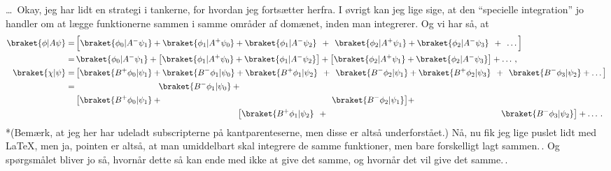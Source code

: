 \documentclass{report}
\begin{document}
\ldots\ Okay, jeg har lidt en strategi i tankerne, for hvordan jeg fortsætter herfra. I øvrigt kan jeg lige sige, at den ``specielle integration'' jo handler om at lægge funktionerne sammen i samme områder af domænet, inden man integrerer. Og vi har så, at
\begin{align}
\begin{aligned}
	\braket{\phi| A \psi} = &\,
			\Big[
			\braket{\phi_0 | A^- \psi_1} 
				+ \braket{\phi_1 | A^+ \psi_0} 
				+ \braket{\phi_1 | A^- \psi_2} 
				\:\:+\:\: \braket{\phi_2 | A^+ \psi_1} 
				+ \braket{\phi_2 | A^- \psi_3} 
				\:\:+\:\: \ldots
			\Big]%
			\\
		=&\,
			\braket{\phi_0 | A^- \psi_1} +
			\big[
				\braket{\phi_1 | A^+ \psi_0} +
				\braket{\phi_1 | A^- \psi_2}
			\big] + \big[
				\braket{\phi_2 | A^+ \psi_1} +
				\braket{\phi_2 | A^- \psi_3} 
			\big]%
			+ \ldots\,,\\
	\braket{\chi| \psi} = &\,
			\big[
				\braket{B^+ \phi_0 | \psi_1} +
					\braket{B^- \phi_1 | \psi_0} +
					\braket{B^+ \phi_1 | \psi_2} \:\:+\:\:
					\braket{B^- \phi_2 | \psi_1} +
					\braket{B^+ \phi_2 | \psi_3} \:\:+\:\:
					\braket{B^- \phi_3 | \psi_2} +
					\ldots
			\big]%
			\\
		= &\,
\phantom{	\big[
				\braket{B^+ \phi_0 | \psi_1} +			}
				\braket{B^- \phi_1 | \psi_0} +
\phantom{		\braket{B^+ \phi_1 | \psi_2} +
				\braket{B^- \phi_2 | \psi_1} %
			\big]										}
			\\
		&\,
			\big[
				\braket{B^+ \phi_0 | \psi_1} +
\phantom{
				\braket{B^- \phi_1 | \psi_0} +
				\braket{B^+ \phi_1 | \psi_2} \:\:+\:\:	}
				\braket{B^- \phi_2 | \psi_1} %
			\big]%
			+ \\
			&\,
\phantom{		\braket{B^+ \phi_0 | \psi_1} +
				\braket{B^- \phi_1 | \psi_0} +			}
			\big[
				\braket{B^+ \phi_1 | \psi_2} \:\:+\:\:
\phantom{		\braket{B^- \phi_2 | \psi_1} +
				\braket{B^+ \phi_2 | \psi_3} \:\:+\:\:	}
				\braket{B^- \phi_3 | \psi_2}
			\big]%
			+ \ldots\,.
	\label{LaTeX-puslespil}
\end{aligned}
\end{align}
*(Bemærk, at jeg her har udeladt subscripterne på kantparenteserne, men disse er altså underforstået.)
Nå, nu fik jeg lige puslet lidt med \LaTeX, men ja, pointen er altså, at man umiddelbart skal integrere de samme funktioner, men bare forskelligt lagt sammen.\,. Og spørgsmålet bliver jo så, hvornår dette så kan ende med ikke at give det samme, og hvornår det vil give det samme.\,. 
\end{document}
